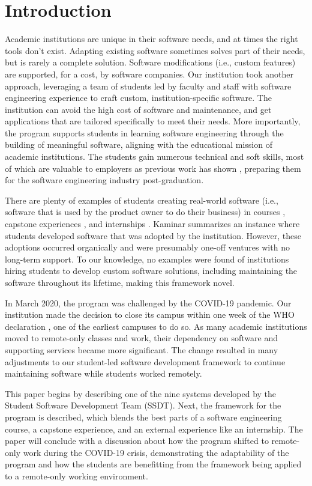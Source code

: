 \section{Introduction}

Academic institutions are unique in their software needs, and at times the right tools don't exist. Adapting existing software sometimes solves part of their needs, but is rarely a complete solution. Software modifications (i.e., custom features) are supported, for a cost, by software companies. Our institution took another approach, leveraging a team of students led by faculty and staff with software engineering experience to craft custom, institution-specific software. The institution can avoid the high cost of software and maintenance, and get applications that are tailored specifically to meet their needs. More importantly, the program supports students in learning software engineering through the building of meaningful software, aligning with the educational mission of academic institutions. The students gain numerous technical and soft skills, most of which are valuable to employers \cite{lavy2013soft} as previous work has shown \cite{heggen2018hiring}, preparing them for the software engineering industry post-graduation.

There are plenty of examples of students creating real-world software (i.e., software that is used by the product owner to do their business) in courses \cite{tadayon2004software}, capstone experiences \cite{capstone}, and internships \cite{rochesterfirstundergradsoftwareteam}. Kaminar \cite{kaminer_2014} summarizes an instance where students developed software that was adopted by the institution. However, these adoptions occurred organically and were presumably one-off ventures with no long-term support. To our knowledge, no examples were found of institutions hiring students to develop custom software solutions, including maintaining the software throughout its lifetime, making this framework novel.

In March 2020, the program was challenged by the COVID-19 pandemic. Our institution made the decision to close its campus within one week of the WHO declaration \cite{covid}, one of the earliest campuses to do so. As many academic institutions moved to remote-only classes and work, their dependency on software and supporting services became more significant. The change resulted in many adjustments to our student-led software development framework to continue maintaining software while students worked remotely.

This paper begins by describing one of the nine systems developed by the Student Software Development Team (SSDT). Next, the framework for the program is described, which blends the best parts of a software engineering course, a capstone experience, and an external experience like an internship. The paper will conclude with a discussion about how the program shifted to remote-only work during the COVID-19 crisis, demonstrating the adaptability of the program and how the students are benefitting from the framework being applied to a remote-only working environment.
